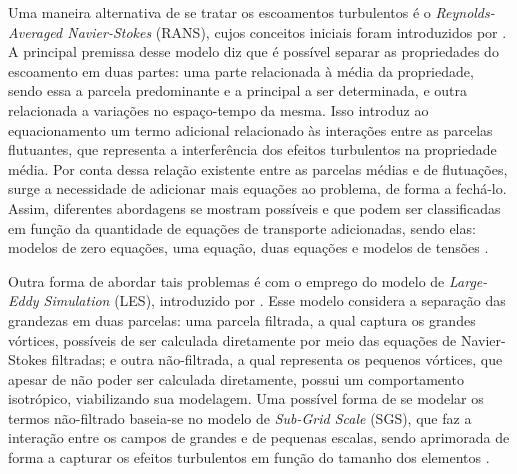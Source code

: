 Uma maneira alternativa de se tratar os escoamentos turbulentos é o \textit{Reynolds-Averaged Navier-Stokes} (RANS), cujos conceitos iniciais foram introduzidos por . A principal premissa desse modelo diz que é possível separar as propriedades do escoamento em duas partes: uma parte relacionada à média da propriedade, sendo essa a parcela predominante e a principal a ser determinada, e outra relacionada a variações no espaço-tempo da mesma. Isso introduz ao equacionamento um termo adicional relacionado às interações entre as parcelas flutuantes, que representa a interferência dos efeitos turbulentos na propriedade média. Por conta dessa relação existente entre as parcelas médias e de flutuações, surge a necessidade de adicionar mais equações ao problema, de forma a fechá-lo. Assim, diferentes abordagens se mostram possíveis e que podem ser classificadas em função da quantidade de equações de transporte adicionadas, sendo elas: modelos de zero equações, uma equação, duas equações e modelos de tensões \cite{piomelli1999large,alfonsi2009reynolds,bazilevs2010large,ling2015evaluation}.

 \label{LES}

Outra forma de abordar tais problemas é com o emprego do modelo de \textit{Large-Eddy Simulation} (LES), introduzido por . Esse modelo considera a separação das grandezas em duas parcelas: uma parcela filtrada, a qual captura os grandes vórtices, possíveis de ser calculada diretamente por meio das equações de Navier-Stokes filtradas; e outra não-filtrada, a qual representa os pequenos vórtices, que apesar de não poder ser calculada diretamente, possui um comportamento isotrópico, viabilizando sua modelagem. Uma possível forma de se modelar os termos não-filtrado baseia-se no modelo de \textit{Sub-Grid Scale} (SGS), que faz a interação entre os campos de grandes e de pequenas escalas, sendo aprimorada de forma a capturar os efeitos turbulentos em função do tamanho dos elementos \cite{ghosal1995basic,hughes2000large,moeng2015large}.%

